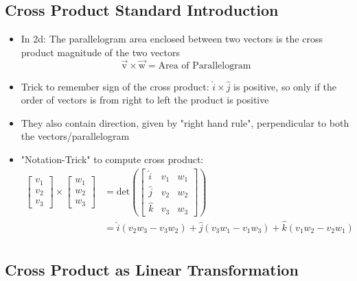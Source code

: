 \documentclass[a4paper]{article}
\begin{document}
\subsection{Cross Product Standard Introduction}
\begin{itemize}
	\item In 2d: The parallelogram area enclosed between two
	      vectors is the cross product magnitude of the two
	      vectors
	      \[
		      \vec{\text{v}}
		      \times
		      \vec{\text{w}}
		      = \text{Area of Parallelogram}
	      \]
	\item Trick to remember sign of the cross product: \newline
	      $\hat{i} \times \hat{j}$ is positive, so only if the
	      order of vectors is from right to left
	      the product is positive
	\item They also contain direction, given by "right hand rule",
	      perpendicular to both the vectors/parallelogram
	\item "Notation-Trick" to compute cross product:
	      \begin{align*}
		      \begin{bmatrix}
			      v_1 \\
			      v_2 \\
			      v_3\end{bmatrix}
		      \times
		      \begin{bmatrix}
			      w_1 \\
			      w_2 \\
			      w_3\end{bmatrix}
		       & = \text{det}\left(
		      \begin{bmatrix}
				      \hat{i} & v_1 & w_1 \\
				      \hat{j} & v_2 & w_2 \\
				      \hat{k} & v_3 & w_3\end{bmatrix}
		      \right)                       \\
		       & = \hat{i}(v_2w_3 - v_3w_2)
		      + \hat{j}(v_3w_1 - v_1w_3)
		      + \hat{k}(v_1w_2 - v_2w_1)    \\
	      \end{align*}
\end{itemize}

\subsection{Cross Product as Linear Transformation}
\end{document}
